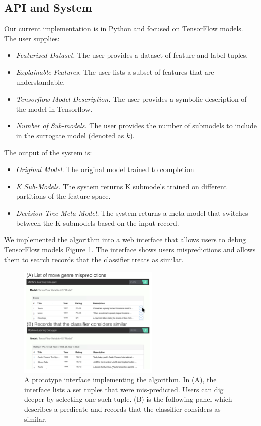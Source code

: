\subsection{API and System}
Our current implementation is in Python and focused on TensorFlow models.  The user supplies:
\begin{itemize}
\item \emph{Featurized Dataset. } The user provides a dataset of feature and label tuples.

\item \emph{Explainable Features. } The user lists a subset of features that are understandable.

\item \emph{Tensorflow Model Description. } The user provides a symbolic description of the model in Tensorflow.

\item \emph{Number of Sub-models. } The user provides the number of submodels to include in the surrogate model (denoted as $k$).
\end{itemize}

The output of the system is:
\begin{itemize}
\item \emph{Original Model. } The original model trained to completion

\item \emph{K Sub-Models. } The system returns K submodels trained on different partitions of the feature-space.

\item \emph{Decision Tree Meta Model. } The system returns a meta model that switches between the K submodels based on the input record.
\end{itemize}

We implemented the algorithm into a web interface that allows users to debug TensorFlow models Figure \ref{fig:interface}. The interface shows users mispredictions and allows them to search records that the classifier treats as similar.

\begin{figure}[t]
    \centering
    \includegraphics[width=0.6\textwidth]{figures/interface.png}
    \caption{A prototype interface implementing the algorithm. In (A), the interface lists a set tuples that were mis-predicted. Users can dig deeper by selecting one such tuple. (B) is the following panel which describes a predicate and records that the classifier considers as similar.}
    \label{fig:interface}
\end{figure}